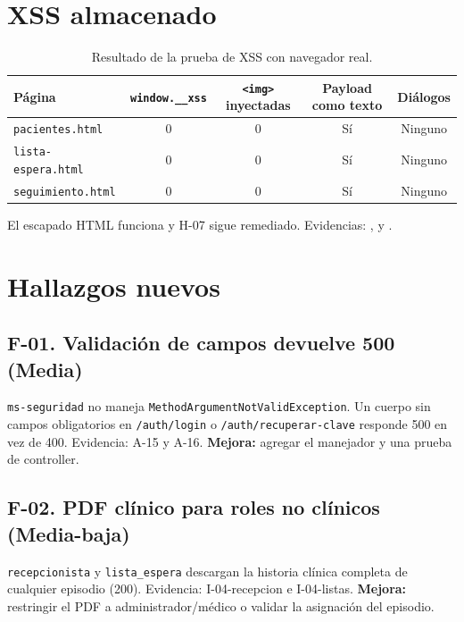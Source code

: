 \documentclass[11pt]{article}
\begin{document}
\section{XSS almacenado}

\begin{table}[h]
\centering
\small
\begin{tabular}{@{}lcccc@{}}
\toprule
Página & \texttt{window.\_\_xss} & \texttt{<img>} inyectadas & Payload como texto & Diálogos \\
\midrule
\texttt{pacientes.html} & 0 & 0 & Sí & Ninguno \\
\texttt{lista-espera.html} & 0 & 0 & Sí & Ninguno \\
\texttt{seguimiento.html} & 0 & 0 & Sí & Ninguno \\
\bottomrule
\end{tabular}
\caption{Resultado de la prueba de XSS con navegador real.}
\end{table}

El escapado HTML funciona y H-07 sigue remediado. Evidencias:
,
 y
.

\section{Hallazgos nuevos}

\subsection*{F-01. Validación de campos devuelve 500 (Media)}

\texttt{ms-seguridad} no maneja \texttt{MethodArgumentNotValidException}. Un
cuerpo sin campos obligatorios en \texttt{/auth/login} o
\texttt{/auth/recuperar-clave} responde 500 en vez de 400. Evidencia: A-15 y
A-16. \textbf{Mejora:} agregar el manejador y una prueba de controller.

\subsection*{F-02. PDF clínico para roles no clínicos (Media-baja)}

\texttt{recepcionista} y \texttt{lista\_espera} descargan la historia clínica
completa de cualquier episodio (200). Evidencia: I-04-recepcion e I-04-listas.
\textbf{Mejora:} restringir el PDF a administrador/médico o validar la
asignación del episodio.
\end{document}
